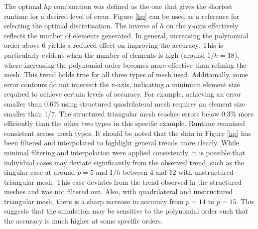 The optimal $hp$ combination was defined as the one that gives the shortest runtime for a desired level of error. Figure \ref{hp} can be used as a reference for selecting the optimal discretisation. The inverse of $h$ on the y-axis effectively reflects the number of elements generated. In general, increasing the polynomial order above 6 yields a reduced effect on improving the accuracy. This is particularly evident when the number of elements is high (around $1/h = 18$), where increasing the polynomial order becomes more effective than refining the mesh.  This trend holds true for all three types of mesh used. Additionally, some error contours do not intersect the x-axis, indicating a minimum element size required to achieve certain levels of accuracy. For example, achieving an error smaller than 0.6\% using structured quadrilateral mesh requires an element size smaller than 1/7. The structured triangular mesh reaches errors below 0.3\% more efficiently than the other two types in this specific example. Runtime remained consistent across mesh types. It should be noted that the data in Figure \ref{hp} has been filtered and interpolated to highlight general trends more clearly. While minimal filtering and interpolation were applied consistently, it is possible that individual cases may deviate significantly from the observed trend, such as the singular case at around $p = 5$ and $1/h$ between 4 and 12 with unstructured triangular mesh. This case deviates from the trend observed in the structured meshes and was not filtered out. Also, with quadrilateral and unstructured triangular mesh, there is a sharp increase in accuracy from $p = 14$ to $p = 15$. This suggests that the simulation may be sensitive to the polynomial order such that the accuracy is much higher at some specific orders.  

